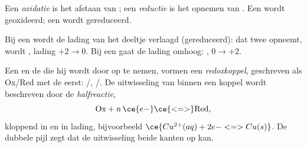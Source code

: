 \begin{definition}\label{def:g11:redox:oxidation}
Een \emph{oxidatie} is het afstaan van ; een
\emph{reductie} is het opnemen van . Een
 wordt geoxideerd; een  wordt gereduceerd.
\end{definition}

\begin{remark}\label{rem:g11:redox:remember}
Bij een \emph{} wordt de lading van het deeltje verlaagd
(gereduceerd):  dat twee  opneemt, wordt ,
lading $+2 \to 0$. Bij een  gaat de lading omhoog:
, $0 \to +2$.
\end{remark}

\begin{definition}\label{def:g11:redox:couple}
Een  en de  die hij wordt door  op te nemen,
vormen een \emph{redoxkoppel}, geschreven als Ox/Red
met de  eerst: /, /. De
uitwisseling van  binnen een koppel wordt beschreven door de
\emph{halfreactie},
\[
  \text{Ox} + n\,\ce{e-} \ce{<=>} \text{Red}, %
\]
kloppend in  en in lading, bijvoorbeeld
$\ce{Cu^{2+}(aq) + 2e- <=> Cu(s)}$. De dubbele pijl zegt dat de
uitwisseling beide kanten op kan.
\end{definition}

